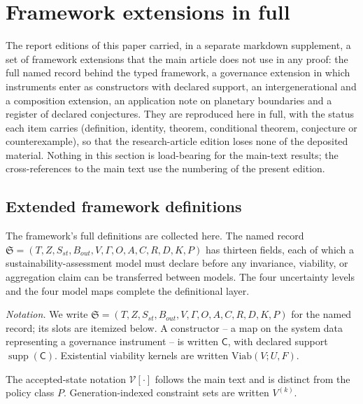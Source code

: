 
\section{Framework extensions in full}\label{si:framework}

The report editions of this paper carried, in a separate markdown supplement, a set of framework extensions that the main article does not use in any proof: the full named record behind the typed framework, a governance extension in which instruments enter as constructors with declared support, an intergenerational and a composition extension, an application note on planetary boundaries and a register of declared conjectures. They are reproduced here in full, with the status each item carries (definition, identity, theorem, conditional theorem, conjecture or counterexample), so that the research-article edition loses none of the deposited material. Nothing in this section is load-bearing for the main-text results; the cross-references to the main text use the numbering of the present edition.

\subsection{Extended framework definitions}

The framework's full definitions are collected here. The named record $\mathfrak{S} = (T, Z, S_{st}, B_{out}, V, \Gamma, O, A, C, R, D, K, P)$ has thirteen fields, each of which a sustainability-assessment model must declare before any invariance, viability, or aggregation claim can be transferred between models. The four uncertainty levels and the four model maps complete the definitional layer.

\emph{Notation.} We write $\mathfrak{S} = (T, Z, S_{st}, B_{out}, V, \Gamma, O, A, C, R, D, K, P)$ for the named record; its slots are itemized below. A constructor -- a map on the system data representing a governance instrument -- is written $\mathsf{C}$, with declared support $\operatorname{supp}(\mathsf{C})$. Existential viability kernels are written $\mathrm{Viab}(V; U, F)$.

The accepted-state notation $\mathcal{V}[\cdot]$ follows the main text and is distinct from the policy class $P$. Generation-indexed constraint sets are written $V^{(k)}$.

